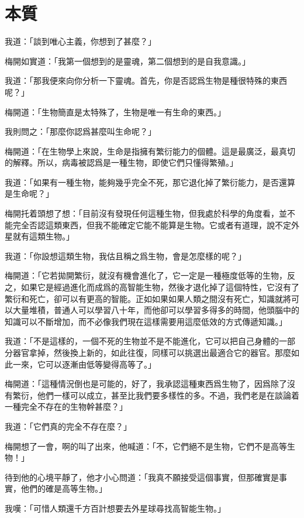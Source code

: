 \chapter{本質}

我道：「談到唯心主義，你想到了甚麼？」

梅開如實道：「我第一個想到的是靈魂，第二個想到的是自我意識。」

我道：「那我便來向你分析一下靈魂。首先，你是否認爲生物是種很特殊的東西呢？」

梅開道：「生物簡直是太特殊了，生物是唯一有生命的東西。」

我則問之：「那麼你認爲甚麼叫生命呢？」

梅開道：「在生物學上來說，生命是指擁有繁衍能力的個體。這是最廣泛，最真切的解釋。所以，病毒被認爲是一種生物，即使它們只懂得繁殖。」

我道：「如果有一種生物，能夠幾乎完全不死，那它退化掉了繁衍能力，是否還算是生命呢？」

梅開托着頭想了想：「目前沒有發現任何這種生物，但我處於科學的角度看，並不能完全否認這類東西，但我不能確定它能不能算是生物。它或者有道理，說不定外星就有這類生物。」

我道：「你設想這類生物，我估且稱之爲生物，會是怎麼樣的呢？」

梅開道：「它若拋開繁衍，就沒有機會進化了，它一定是一種極度低等的生物，反之，如果它是經過進化而成爲的高智能生物，然後才退化掉了這個特性，它沒有了繁衍和死亡，卻可以有更高的智能。正如如果如果人類之間沒有死亡，知識就將可以大量堆積，普通人可以學習八十年，而他卻可以學習多得多的時間，他頭腦中的知識可以不斷增加，而不必像我們現在這樣需要用這麼低效的方式傳遞知識。」

我道：「不是這樣的，一個不死的生物並不是不能進化，它可以把自己身體的一部分器官拿掉，然後換上新的，如此往復，同樣可以挑選出最適合它的器官。那麼如此一來，它可以逐漸由低等變得高等了。」

梅開道：「這種情況倒也是可能的，好了，我承認這種東西爲生物了，因爲除了沒有繁衍，他們一樣可以成立，甚至比我們要多樣性的多。不過，我們老是在談論着一種完全不存在的生物幹甚麼？」

我道：「它們真的完全不存在麼？」

梅開想了一會，啊的叫了出來，他喊道：「不，它們絕不是生物，它們不是高等生物！」

待到他的心境平靜了，他才小心問道：「我真不願接受這個事實，但那確實是事實，他們的確是高等生物。」

我嘆：「可惜人類還千方百計想要去外星球尋找高智能生物。」

